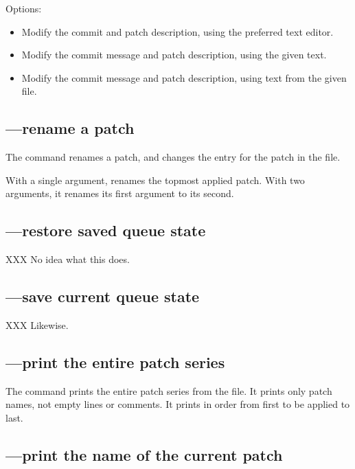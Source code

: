 Options:
\begin{itemize}
\item[\hgxopt{mq}{qrefresh}{-e}] Modify the commit and patch description,
  using the preferred text editor.
\item[\hgxopt{mq}{qrefresh}{-m}] Modify the commit message and patch
  description, using the given text.
\item[\hgxopt{mq}{qrefresh}{-l}] Modify the commit message and patch
  description, using text from the given file.
\end{itemize}

\subsection{---rename a patch}

The  command renames a patch, and changes the entry for
the patch in the  file.

With a single argument,  renames the topmost applied
patch.  With two arguments, it renames its first argument to its
second.

\subsection{---restore saved queue state}

XXX No idea what this does.

\subsection{---save current queue state}

XXX Likewise.

\subsection{---print the entire patch series}

The  command prints the entire patch series from the
 file.  It prints only patch names, not empty lines
or comments.  It prints in order from first to be applied to last.

\subsection{---print the name of the current patch}

